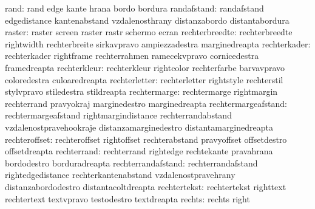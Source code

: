                      rand: rand                      edge
                           kante                     hrana
                           bordo                     bordura
              randafstand: randafstand               edgedistance
                           kantenabstand             vzdalenosthrany
                           distanzabordo             distantabordura
                   raster: raster                    screen
                           raster                    rastr
                           schermo                   ecran
           rechterbreedte: rechterbreedte            rightwidth
                           rechterbreite             sirkavpravo
                           ampiezzadestra            marginedreapta
             rechterkader: rechterkader              rightframe
                           rechterrahmen             ramecekvpravo
                           cornicedestra             framedreapta
             rechterkleur: rechterkleur              rightcolor
                           rechterfarbe              barvavpravo
                           coloredestra              culoaredreapta
            rechterletter: rechterletter             rightstyle
                           rechterstil               stylvpravo
                           stiledestra               stildreapta
             rechtermarge: rechtermarge              rightmargin
                           rechterrand               pravyokraj
                           marginedestro             marginedreapta
      rechtermargeafstand: rechtermargeafstand       rightmargindistance
                           rechterrandabstand        vzdalenostpravehookraje
                           distanzamarginedestro     distantamarginedreapta
            rechteroffset: rechteroffset             rightoffset
                           rechterabstand            pravyoffset
                           offsetdestro              offsetdreapta
              rechterrand: rechterrand               rightedge
                           rechtekante               pravahrana
                           bordodestro               borduradreapta
       rechterrandafstand: rechterrandafstand        rightedgedistance
                           rechterkantenabstand      vzdalenostpravehrany
                           distanzabordodestro       distantacoltdreapta
             rechtertekst: rechtertekst              righttext
                           rechtertext               textvpravo
                           testodestro               textdreapta %
                   rechts: rechts                    right
